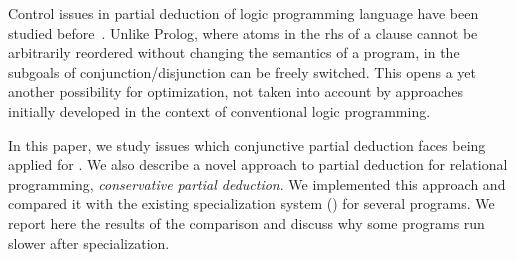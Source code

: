 Control issues in partial deduction of logic programming language \pro have been studied before~\cite{leuschel2002logic}.
Unlike Prolog, where atoms in the rhs of a clause cannot be arbitrarily reordered without changing the semantics of a program, in \mk the subgoals of conjunction/disjunction can be freely switched.
This opens a yet another possibility for optimization, not taken into account by approaches initially developed in the context of conventional logic programming.

In this paper, we study issues which conjunctive partial deduction faces being applied for \mk.
We also describe a novel approach to partial deduction for relational programming, \emph{conservative partial deduction}.
We implemented this approach and compared it with the existing specialization system (\ecce) for several programs.
We report here the results of the comparison and discuss why some \mk programs run slower after specialization.
